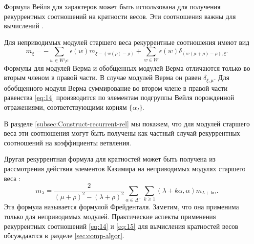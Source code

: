 Формула Вейля для характеров может быть использована для получения рекуррентных соотношений на кратности весов. Эти соотношения важны для вычислений \cite{il2010folded,kulish4sfa}. 

Для неприводимых модулей старшего веса рекуррентные соотношения имеют вид
\begin{equation}
\label{eq:14}
m_{\xi }=-\sum_{w\in W\setminus e}\epsilon (w)m_{\xi
-\left( w(\rho )-\rho \right) }+\sum_{w\in W}\epsilon
(w)\delta _{\left( w(\mu +\rho )-\rho \right) ,\xi }.
\end{equation}
Формулы для модулей Верма и обобщенных модулей Верма отличаются только во вторым членом в правой части. В случае модулей Верма он равен $\delta_{\xi,\mu}$. Для обобщенного модуля Верма суммирование во втором члене в правой части равенства \eqref{eq:14} производится по элементам подгруппы Вейля порожденной отражениями, соответствующими корням $\{\alpha_{I}\}$.

В разделе \ref{subsec:Construct-recurrent-rel} мы покажем, что для модулей старшего веса эти соотношения могут быть получены как частный случай рекуррентных соотношений на коэффициенты ветвления.

Другая рекуррентная формула для кратностей может быть получена из рассмотрения действия элементов Казимира на неприводимых модулях старшего веса \cite{humphreys1997introduction}:
\begin{equation}
  \label{eq:15}
  m_{\lambda}=\frac{2}{(\mu+\rho)^{2}-(\lambda+\rho)^{2}}\sum_{\alpha\in \Delta^{+}}\sum_{k\geq 1} (\lambda+k\alpha,\alpha)m_{\lambda+k\alpha}.
\end{equation}
Эта формула называется формулой Фрейденталя. Заметим, что она применима только для неприводимых модулей.
Практические аспекты применения рекуррентных соотношений \eqref{eq:14} и \eqref{eq:15} для вычисления кратностей весов обсуждаются в разделе \ref{sec:comp-algor}. 

